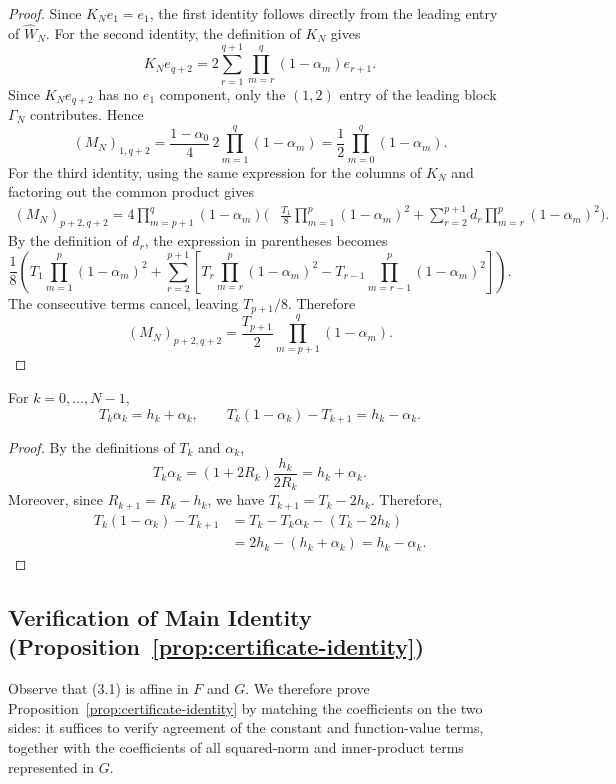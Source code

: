 \begin{proof}
Since $K_Ne_1=e_1$, the first identity follows directly from the leading entry of $\widehat W_N$.
For the second identity, the definition of $K_N$ gives
\[K_Ne_{q+2}=2\sum_{r=1}^{q+1}\prod_{m=r}^{q}(1-\alpha_m)e_{r+1}. \]
Since $K_Ne_{q+2}$ has no $e_1$ component, only the $(1,2)$ entry of the leading block $\Gamma_N$ contributes. Hence
\[(M_N)_{1,q+2}=\frac{1-\alpha_0}{4}\,2\prod_{m=1}^{q}(1-\alpha_m)
=\frac12\prod_{m=0}^{q}(1-\alpha_m). \]
For the third identity, using the same expression for the columns of $K_N$ and factoring out the common product gives
\[\begin{aligned} (M_N)_{p+2,q+2}=4\prod_{m=p+1}^{q}(1-\alpha_m)\Bigg( &\frac{T_1}{8}\prod_{m=1}^{p}(1-\alpha_m)^2 +\sum_{r=2}^{p+1}d_r\prod_{m=r}^{p}(1-\alpha_m)^2 \Bigg). \end{aligned} \]
By the definition of $d_r$, the expression in parentheses becomes
\[\frac18\left( T_1\prod_{m=1}^{p}(1-\alpha_m)^2 +\sum_{r=2}^{p+1}
\left[T_r\prod_{m=r}^{p}(1-\alpha_m)^2 -T_{r-1}\prod_{m=r-1}^{p}(1-\alpha_m)^2\right] \right). \]
The consecutive terms cancel, leaving $T_{p+1}/8$. Therefore
\[(M_N)_{p+2,q+2}
=\frac{T_{p+1}}2\prod_{m=p+1}^{q}(1-\alpha_m). \]
\end{proof}
\begin{lemma}\label{lem:T-alpha}
For $k=0,\ldots,N-1$,
\[ T_k\alpha_k=h_k+\alpha_k, \qquad T_k(1-\alpha_k)-T_{k+1}=h_k-\alpha_k.
\]
\end{lemma}
\begin{proof}
By the definitions of $T_k$ and $\alpha_k$,
\[ T_k\alpha_k=(1+2R_k)\frac{h_k}{2R_k}=h_k+\alpha_k. \]
Moreover, since $R_{k+1}=R_k-h_k$, we have $T_{k+1}=T_k-2h_k$. Therefore,
\[ \begin{aligned}
T_k(1-\alpha_k)-T_{k+1}
&=T_k-T_k\alpha_k-(T_k-2h_k)\\
&=2h_k-(h_k+\alpha_k)
=h_k-\alpha_k.
\end{aligned} \]
\end{proof}

\subsection{Verification of Main Identity (Proposition~\ref{prop:certificate-identity})}
Observe that (3.1) is affine in $F$ and $G$. We therefore prove Proposition~\ref{prop:certificate-identity} by matching the coefficients on the two sides: it suffices to verify agreement of the constant and function-value terms, together with the coefficients of all squared-norm and inner-product terms represented in $G$.
